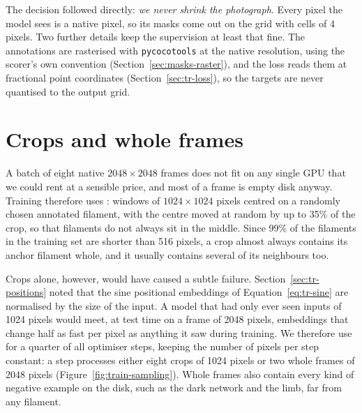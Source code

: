 The decision followed directly: \emph{we never shrink the photograph}. Every pixel the model sees is
a native pixel, so its masks come out on the grid with cells of 4 pixels. Two further details keep the
supervision at least that fine. The annotations are rasterised with \texttt{pycocotools} at the native
resolution, using the scorer's own convention (Section~\ref{sec:masks-raster}), and the loss reads
them at fractional point coordinates (Section~\ref{sec:tr-loss}), so the targets are never quantised
to the output grid.

\section{Crops and whole frames}\label{sec:train-sampling}
A batch of eight native $2048\times2048$ frames does not fit on any single GPU that we could rent at a
sensible price, and most of a frame is empty disk anyway. Training therefore uses :
windows of $1024\times1024$ pixels centred on a randomly chosen annotated filament, with the centre
moved at random by up to 35\% of the crop, so that filaments do not always sit in the middle. Since 99\%
of the filaments in the training set are shorter than 516 pixels, a crop almost always contains its
anchor filament whole, and it usually contains several of its neighbours too.

Crops alone, however, would have caused a subtle failure. Section~\ref{sec:tr-positions} noted that the
sine positional embeddings of Equation~\eqref{eq:tr-sine} are normalised by the size of the input. A
model that had only ever seen inputs of 1024 pixels would meet, at test time on a frame of 2048 pixels,
embeddings that change half as fast per pixel as anything it saw during training. We therefore use
 for a quarter of all optimiser steps, keeping the number of pixels per step
constant: a step processes either eight crops of 1024 pixels or two whole frames of 2048 pixels
(Figure~\ref{fig:train-sampling}). Whole frames also contain every kind of negative example on the
disk, such as the dark network and the limb, far from any filament.

